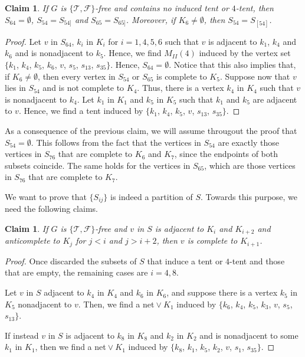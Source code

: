 \documentclass[12pt]{book}
\theoremstyle{plain}
\newtheorem{claim}[teo]{Claim}
\newcounter{cases}
\theoremstyle{remark}
\begin{document}
\begin{claim} \label{claim:co4tent_2} %
	If $G$ is $\{ \mathcal{T}, \mathcal{F} \}$-free and contains no induced tent or $4$-tent, then $S_{64}= \emptyset$, $S_{54} = S_{54]}$ and $S_{65}=S_{65]}$. Moreover, if $K_6 \neq \emptyset$, then $S_{54} = S_{[54]}$.
\end{claim} 
\begin{proof}
	Let $v$ in $S_{64}$, $k_i$ in $K_i$ for $i=1, 4, 5, 6$ such that $v$ is adjacent to $k_1$, $k_4$ and $k_6$ and is nonadjacent to $k_5$. Hence, we find $M_{II}(4)$ induced by the vertex set $\{ k_1$, $k_4$, $k_5$, $k_6$, $v$, $s_5$, $s_{13}$, $s_{35} \}$. Hence, $S_{64} = \emptyset$. 
Notice that this also implies that, if $K_6 \neq \emptyset$, then every vertex in $S_{54}$ or $S_{65}$ is complete to $K_5$. Suppose now that $v$ lies in $S_{54}$ and is not complete to $K_4$. Thus, there is a vertex $k_4$ in $K_4$ such that $v$ is nonadjacent to $k_4$. Let $k_1$ in $K_1$ and $k_5$ in $K_5$ such that $k_1$ and $k_5$ are adjacent to $v$. Hence, we find a tent induced by $\{ k_1$, $k_4$, $k_5$, $v$, $s_{13}$, $s_{35} \}$. 
\end{proof}

\vspace{1mm}
As a consequence of the previous claim, we will assume througout the proof that $S_{54} = \emptyset$. This follows from the fact that the vertices in $S_{54}$ are exactly those vertices in $S_{76}$ that are complete to $K_6$ and $K_7$, since the endpoints of both subsets coincide. The same holds for the vertices in $S_{65}$, which are those vertices in $S_{76}$ that are complete to $K_7$.

\vspace{1mm}
We want to prove that $\{S_{ij}\}$ is indeed a partition of $S$. Towards this purpose, we need the following claims.

\begin{claim} \label{claim:co4tent_3} %
	If $G$ is $\{ \mathcal{T}, \mathcal{F} \}$-free and $v$ in $S$ is adjacent to $K_i$ and $K_{i+2}$ and anticomplete to $K_j$ for $j < i$ and $j>i+2$, then $v$ is complete to $K_{i+1}$.
\end{claim}

\begin{proof}
	Once discarded the subsets of $S$ that induce a tent or $4$-tent and those that are empty, the remaining cases are $i=4, 8$. 

Let $v$ in $S$ adjacent to $k_4$ in $K_4$ and $k_6$ in $K_6$, and suppose there is a vertex $k_5$ in $K_5$ nonadjacent to $v$. Then, we find a net${}\vee K_1$ induced by $\{k_6$, $k_4$, $k_5$, $k_3$, $v$, $s_5$, $s_{13}\}$. 

If instead $v$ in $S$ is adjacent to $k_8$ in $K_8$ and $k_2$ in $K_2$ and is nonadjacent to some $k_1$ in $K_1$, then we find a net${}\vee K_1$ induced by $\{k_8$, $k_1$, $k_5$, $k_2$, $v$, $s_1$, $s_{35}\}$.
\end{proof}
\end{document}
